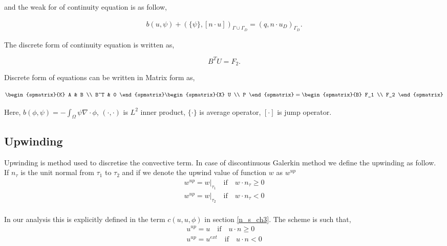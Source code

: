 \documentclass[a4paper,12pt]{book}
\begin{document}
and the weak for of continuity equation is as follow,

\begin{equation}\label{contiuity_weak_ch3}
\begin{split}
b(u,\psi) + (\{\psi\},[n\cdot u])_{\Gamma \cup \Gamma_D} = (q,n\cdot u_D)_{\Gamma_D} \textrm{.}
\end{split}
\end{equation}

The discrete form of continuity equation is written as,

\begin{equation} \label{continuity discrete_ch3}
B^T U  = F_2 \textrm{.}
\end{equation}

Discrete form of equations can be written in Matrix form as, 

\begin{equation} \label{Stokes_matrix_ch3}
\begin{spmatrix}{K}
    A & B \\
    B^T & 0
\end{spmatrix}
\begin{spmatrix}{X}
    U \\
    P
\end{spmatrix}
=
\begin{spmatrix}{B}
    F_1  \\
    F_2
\end{spmatrix}
\end{equation}

Here, $b(\phi,\psi) = -\int_{\Omega} \psi \nabla \cdot \phi$, $(\cdot , \cdot)$ is $L^2$ inner product, $\{\cdot\}$ is average operator, $[\cdot]$ is jump operator. 


\subsection{Upwinding} \label{upwinding}

Upwinding is method used to discretise the convective term. In case of discontinuous Galerkin method we define the upwinding as follow.\\

If $n_\tau$ is the unit normal from $\tau_1$ to $\tau_2$ and if we denote the upwind value of function $w$ as $w^{up}$ \cite{riviere}
\begin{equation}
\begin{split}
w^{up} = w|_{\tau_1} \quad \textrm{if} \quad w \cdot n_\tau \geq 0 \\
w^{up} = w|_{\tau_2} \quad \textrm{if} \quad w \cdot n_\tau < 0
\end{split}
\end{equation}
\\
In our analysis this is explicitly defined in the term $c(u,u,\phi)$ in section \ref{n_s_ch3}. The scheme is such that,
\begin{equation}
\begin{split}
u^{up} = u \quad \textrm{if} \quad u \cdot n \geq 0 \\
u^{up} = u^{ext} \quad \textrm{if} \quad u \cdot n < 0
\end{split}
\end{equation}
\end{document}
